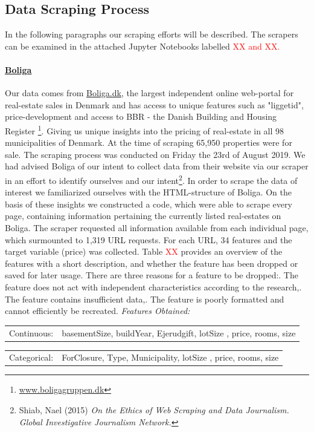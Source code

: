 \documentclass[12pt,a4paper]{article}
\begin{document}
\subsection{Data Scraping Process}
In the following paragraphs our scraping efforts will be described. The scrapers can be examined in the attached Jupyter Notebooks labelled \textcolor{red}{XX and XX.} 
\paragraph{\href{https://www.boliga.dk}{Boliga}\newline}
Our data comes from \href{https://www.boliga.dk}{Boliga.dk}, the largest independent online web-portal for real-estate sales in Denmark and has access to unique features such as "liggetid", price-development and access to BBR - the Danish Building and Housing Register \footnote{\href{https://www.boligagruppen.dk}{www.boligagruppen.dk}}. Giving us unique insights into the pricing of real-estate in all 98 municipalities of Denmark. At the time of scraping 65,950 properties were for sale.\newline
The scraping process was conducted on Friday the 23rd of August 2019. We had advised Boliga of our intent to collect data from their website via our scraper in an effort to identify ourselves and our intent\footnote{Shiab, Nael (2015) \textit{On the Ethics of Web Scraping and Data Journalism. Global Investigative Journalism Network.}}. In order to scrape the data of interest we familiarized ourselves with the HTML-structure of Boliga. On the basis of these insights we constructed a code, which were able to scrape every page, containing information pertaining the currently listed real-estates on Boliga. The scraper requested all information available from each individual page, which surmounted to 1,319 URL requests. \newline
For each URL, 34 features and the target variable (price) was collected. Table \textcolor{red}{XX} provides an overview of the features with a short description, and whether the feature has been dropped or saved for later usage. There are three reasons for a feature to be dropped:. The feature does not act with independent characteristics according to the research,. The feature contains insufficient data,. The feature is poorly formatted and cannot efficiently be recreated. 
\vspace*{10px} \newline
\textit{Features Obtained:} \newline
\begin{tabular}{c c}
Continuous: & basementSize, buildYear, Ejerudgift, lotSize	, price, rooms, size  \\	
\end{tabular}\newline 
\begin{tabular}{c c}
Categorical: & ForClosure, Type, Municipality, lotSize	, price, rooms, size  \\	
\end{tabular}\newline 
\end{document}
